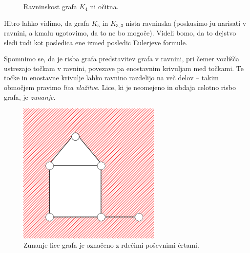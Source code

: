 \documentclass[12pt,a4paper]{amsart}
\theoremstyle{definition} %
\theoremstyle{plain} %
\begin{document}
\begin{figure}[h]

    \caption{Ravninskost grafa $K_4$ ni očitna.}
\end{figure}

Hitro lahko vidimo, da grafa $K_5$ in $K_{3,3}$ nista ravninska (poskusimo ju narisati v ravnini, a kmalu ugotovimo, da to ne bo mogoče). Videli bomo, da to dejstvo sledi tudi kot posledica ene izmed posledic Eulerjeve formule.

Spomnimo se, da je risba grafa predstavitev grafa v ravnini, pri čemer vozlišča ustrezajo točkam v ravnini, povezave pa enostavnim krivuljam med točkami. Te točke in enostavne krivulje lahko ravnino razdelijo na več delov -- takim območjem pravimo \emph{lica vložitve}. Lice, ki je neomejeno in obdaja celotno risbo grafa, je \emph{zunanje}.

\begin{figure}[h]
    \includegraphics[width=200pt]{img/zunanje-lice-grafa.png}
    \caption{Zunanje lice grafa je označeno z rdečimi poševnimi črtami.}
\end{figure}
\end{document}
